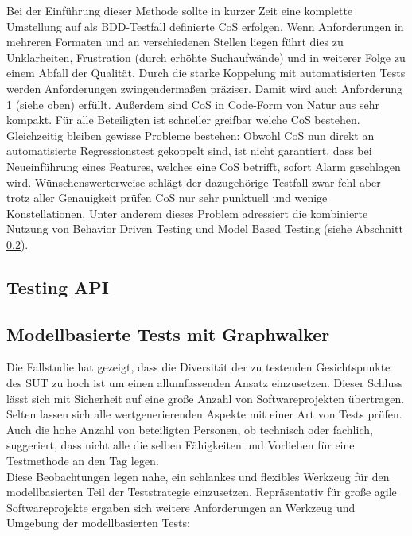 Bei der Einführung dieser Methode sollte in kurzer Zeit eine komplette Umstellung auf als BDD-Testfall definierte CoS erfolgen. Wenn Anforderungen in mehreren Formaten und an verschiedenen Stellen liegen führt dies zu Unklarheiten, Frustration (durch erhöhte Suchaufwände) und in weiterer Folge zu einem Abfall der Qualität. Durch die starke Koppelung mit automatisierten Tests werden Anforderungen zwingendermaßen präziser. Damit wird auch Anforderung 1 (siehe oben) erfüllt. Außerdem sind CoS in Code-Form von Natur aus sehr kompakt. Für alle Beteiligten ist schneller greifbar welche CoS bestehen.\\
Gleichzeitig bleiben gewisse Probleme bestehen: Obwohl CoS nun direkt an automatisierte Regressionstest gekoppelt sind, ist nicht garantiert, dass bei Neueinführung eines Features, welches eine CoS betrifft, sofort Alarm geschlagen wird. Wünschenswerterweise schlägt der dazugehörige Testfall zwar fehl aber trotz aller Genauigkeit prüfen CoS nur sehr punktuell und wenige Konstellationen. Unter anderem dieses Problem adressiert die kombinierte Nutzung von Behavior Driven Testing und Model Based Testing (siehe Abschnitt \ref{sec:mbt_results}).

\subsection{Testing API}
\label{sec:testing_api} 

\subsection{Modellbasierte Tests mit Graphwalker}
\label{sec:mbt_results}
Die Fallstudie hat gezeigt, dass die Diversität der zu testenden Gesichtspunkte des SUT zu hoch ist um einen allumfassenden Ansatz einzusetzen. Dieser Schluss lässt sich mit Sicherheit auf eine große Anzahl von Softwareprojekten übertragen. Selten lassen sich alle wertgenerierenden Aspekte mit einer Art von Tests prüfen. Auch die hohe Anzahl von beteiligten Personen, ob technisch oder fachlich, suggeriert, dass nicht alle die selben Fähigkeiten und Vorlieben für eine Testmethode an den Tag legen.\\
Diese Beobachtungen legen nahe, ein schlankes und flexibles Werkzeug für den modellbasierten Teil der Teststrategie einzusetzen. Repräsentativ für große agile Softwareprojekte ergaben sich weitere Anforderungen an Werkzeug und Umgebung der modellbasierten Tests:

